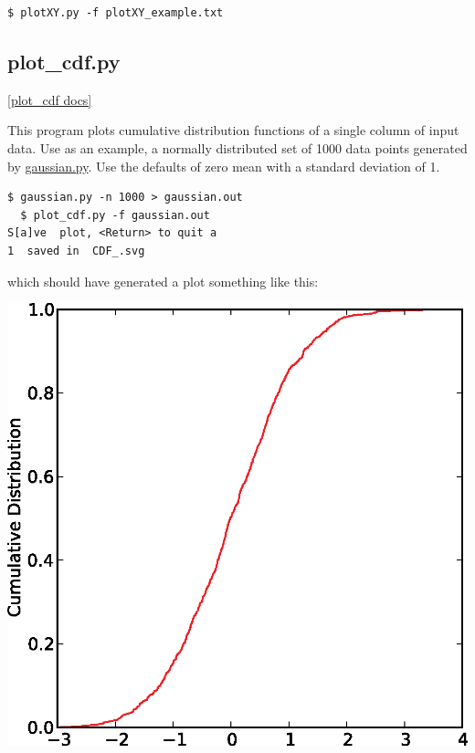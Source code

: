 \documentclass[11pt]{book}
\begin{document}
{{\begin{verbatim}
$ plotXY.py -f plotXY_example.txt
\end{verbatim}


  \subsection{plot\_cdf.py}
  \href{https://github.com/PmagPy/PmagPy/blob/master/programs/plot_cdf.py}{[plot\_cdf docs]}

This program plots cumulative distribution functions of a single column of input data.  Use as an example, a normally distributed set of 1000 data points generated by \href{#gaussian.py}{gaussian.py}.  Use the defaults of zero mean with a standard deviation of 1.

\begin{verbatim}
$ gaussian.py -n 1000 > gaussian.out
  $ plot_cdf.py -f gaussian.out
S[a]ve  plot, <Return> to quit a
1  saved in  CDF_.svg
\end{verbatim}

which should have generated a plot something like this:


\includegraphics[width=12 cm]{EPSfiles/plot_cdf.eps}


%


}}
\end{document}
